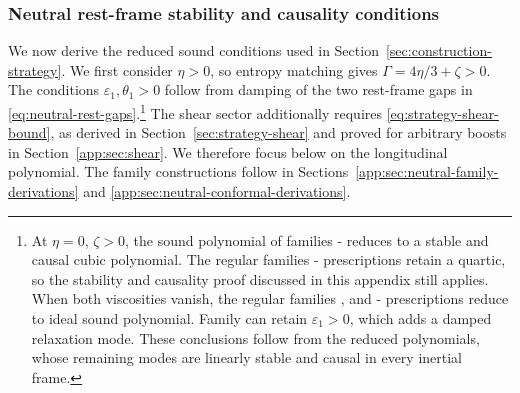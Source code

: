 \subsubsection{Neutral rest-frame stability and causality conditions}
\label{app:sec:neutral-construction}
We now derive the reduced sound conditions used in
Section~\ref{sec:construction-strategy}. We first consider $\eta>0$, so
entropy matching gives $\Gamma=4\eta/3+\zeta>0$. The conditions
$\varepsilon_1,\theta_1>0$ follow from damping of the two rest-frame gaps
in \eqref{eq:neutral-rest-gaps}.\footnote{\label{fn:neutral-zero-transport}At
$\eta=0$, $\zeta>0$, the sound polynomial of families -
reduces to a stable and causal cubic polynomial. The regular families -
prescriptions retain a quartic, so the stability and causality proof discussed in this appendix still applies.
When both viscosities vanish, the regular families ,  and
- prescriptions reduce to ideal sound polynomial. Family
 can retain $\varepsilon_1>0$, which adds a damped relaxation
mode. These conclusions follow from the reduced polynomials, whose
remaining modes are linearly stable and causal in every inertial frame.}
The shear sector additionally requires
\eqref{eq:strategy-shear-bound}, as derived in
Section~\ref{sec:strategy-shear} and proved for arbitrary boosts in
Section~\ref{app:sec:shear}. We therefore focus below on the longitudinal
polynomial. The family constructions follow in
Sections~\ref{app:sec:neutral-family-derivations} and
\ref{app:sec:neutral-conformal-derivations}.

